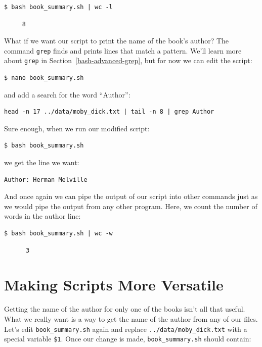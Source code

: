 \documentclass[
]{krantz}
\begin{document}
\begin{verbatim}
$ bash book_summary.sh | wc -l
\end{verbatim}

\begin{verbatim}
     8
\end{verbatim}

What if we want our script to print the name of the book's author?
The command \texttt{grep} finds and prints lines that match a pattern.
We'll learn more about \texttt{grep} in Section~\ref{bash-advanced-grep},
but for now we can edit the script:

\begin{verbatim}
$ nano book_summary.sh
\end{verbatim}

and add a search for the word ``Author'':

\begin{verbatim}
head -n 17 ../data/moby_dick.txt | tail -n 8 | grep Author
\end{verbatim}

Sure enough,
when we run our modified script:

\begin{verbatim}
$ bash book_summary.sh
\end{verbatim}

we get the line we want:

\begin{verbatim}
Author: Herman Melville
\end{verbatim}

And once again
we can pipe the output of our script into other commands
just as we would pipe the output from any other program.
Here,
we count the number of words in the author line:

\begin{verbatim}
$ bash book_summary.sh | wc -w
\end{verbatim}

\begin{verbatim}
      3
\end{verbatim}

\hypertarget{bash-advanced-params}{%
\section{Making Scripts More Versatile}\label{bash-advanced-params}}

Getting the name of the author for only one of the books isn't all that useful.
What we really want is a way to get the name of the author from any of our files.
Let's edit \texttt{book\_summary.sh} again
and replace \texttt{../data/moby\_dick.txt} with
a special variable \texttt{\$1}.
Once our change is made,
\texttt{book\_summary.sh} should contain:
\end{document}
